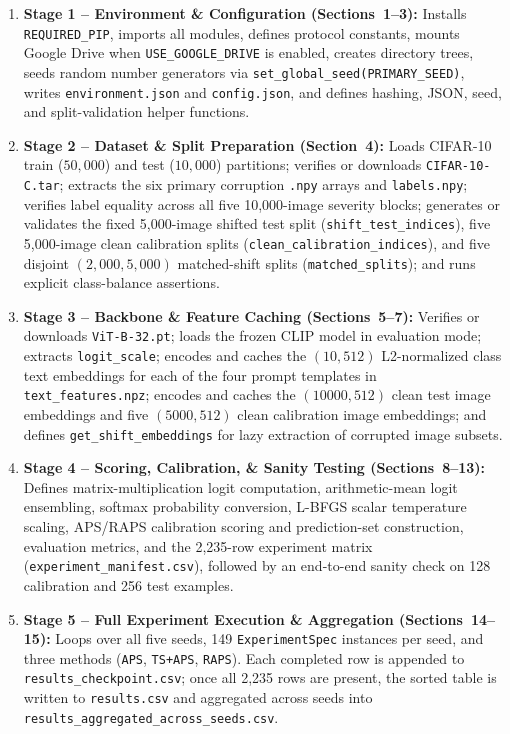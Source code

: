 \documentclass[11pt,a4paper]{article}
\begin{document}
\begin{enumerate}
  \item \textbf{Stage 1 -- Environment \& Configuration (Sections~1--3):} Installs \texttt{REQUIRED\_\allowbreak{}PIP}, imports all modules, defines protocol constants, mounts Google Drive when \texttt{USE\_\allowbreak{}GOOGLE\_\allowbreak{}DRIVE} is enabled, creates directory trees, seeds random number generators via \texttt{set\_\allowbreak{}global\_\allowbreak{}seed(PRIMARY\_\allowbreak{}SEED)}, writes \texttt{environment.json} and \texttt{config.json}, and defines hashing, JSON, seed, and split-validation helper functions.
  \item \textbf{Stage 2 -- Dataset \& Split Preparation (Section~4):} Loads CIFAR-10 train ($50{,}000$) and test ($10{,}000$) partitions; verifies or downloads \texttt{CIFAR-10-C.tar}; extracts the six primary corruption \texttt{.npy} arrays and \texttt{labels.npy}; verifies label equality across all five 10,000-image severity blocks; generates or validates the fixed 5,000-image shifted test split (\texttt{shift\_\allowbreak{}test\_\allowbreak{}indices}), five 5,000-image clean calibration splits (\texttt{clean\_\allowbreak{}calibration\_\allowbreak{}indices}), and five disjoint $(2{,}000, 5{,}000)$ matched-shift splits (\texttt{matched\_\allowbreak{}splits}); and runs explicit class-balance assertions.
  \item \textbf{Stage 3 -- Backbone \& Feature Caching (Sections~5--7):} Verifies or downloads \texttt{ViT-B-32.pt}; loads the frozen CLIP model in evaluation mode; extracts \texttt{logit\_\allowbreak{}scale}; encodes and caches the $(10, 512)$ L2-normalized class text embeddings for each of the four prompt templates in \texttt{text\_\allowbreak{}features.npz}; encodes and caches the $(10000, 512)$ clean test image embeddings and five $(5000, 512)$ clean calibration image embeddings; and defines \texttt{get\_\allowbreak{}shift\_\allowbreak{}embeddings} for lazy extraction of corrupted image subsets.
  \item \textbf{Stage 4 -- Scoring, Calibration, \& Sanity Testing (Sections~8--13):} Defines matrix-multiplication logit computation, arithmetic-mean logit ensembling, softmax probability conversion, L-BFGS scalar temperature scaling, APS/RAPS calibration scoring and prediction-set construction, evaluation metrics, and the 2,235-row experiment matrix (\texttt{experiment\_\allowbreak{}manifest.csv}), followed by an end-to-end sanity check on 128 calibration and 256 test examples.
  \item \textbf{Stage 5 -- Full Experiment Execution \& Aggregation (Sections~14--15):} Loops over all five seeds, 149 \texttt{ExperimentSpec} instances per seed, and three methods (\texttt{APS}, \texttt{TS+APS}, \texttt{RAPS}). Each completed row is appended to \texttt{results\_\allowbreak{}checkpoint.csv}; once all 2,235 rows are present, the sorted table is written to \texttt{results.csv} and aggregated across seeds into \texttt{results\_\allowbreak{}aggregated\_\allowbreak{}across\_\allowbreak{}seeds.csv}.

\end{enumerate}
\end{document}
